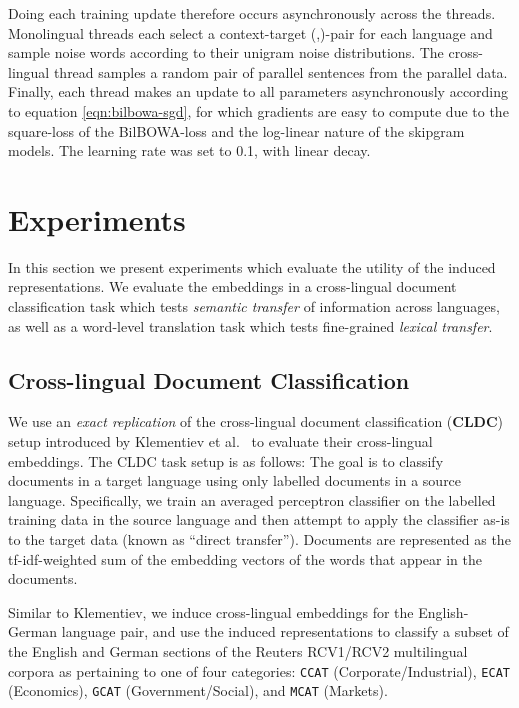 \documentclass[10pt]{article}
\begin{document}
Doing each training update therefore occurs asynchronously across the threads.
Monolingual threads each select a context-target (,)-pair for each language 
and sample  noise words according to their unigram noise distributions.  The cross-lingual
thread samples a random pair of parallel sentences from the parallel data. Finally, 
each thread makes an update to all parameters asynchronously according to equation 
\ref{eqn:bilbowa-sgd}, for which gradients are easy to compute due to the square-loss
of the BilBOWA-loss and the log-linear nature of the skipgram models.  The learning 
rate was set to 0.1, with linear decay.

\section{Experiments}
In this section we present experiments  which evaluate the utility of the
induced representations.  We evaluate the embeddings in a cross-lingual document 
classification task which tests \emph{semantic transfer} of information across languages,
as well as a word-level translation task which tests fine-grained \emph{lexical transfer}.

\subsection{Cross-lingual Document Classification}
\label{sec:cldc}

We use an \emph{exact replication} of the 
cross-lingual document classification (\textbf{CLDC}) setup introduced by Klementiev et
al.~\cite{klementiev2012} to evaluate their cross-lingual embeddings. The
CLDC task setup is as follows: The goal is to classify documents in a target
language using only labelled documents in a source language. Specifically,
we train an averaged perceptron classifier on the labelled training data in the 
source language and then attempt to apply the classifier as-is to the target data (known as
``direct transfer''). Documents are represented as the tf-idf-weighted
sum of the embedding vectors of the words that appear in the documents.

Similar to Klementiev, we induce cross-lingual
embeddings for the English-German language pair, and use the induced
representations to classify a subset of the English and German sections of
the Reuters  RCV1/RCV2 multilingual corpora \cite{lewis2004rcv1} as pertaining
to one of four categories: \texttt{CCAT} (Corporate/Industrial),
\texttt{ECAT} (Economics), \texttt{GCAT} (Government/Social), and
\texttt{MCAT} (Markets).
\end{document}
